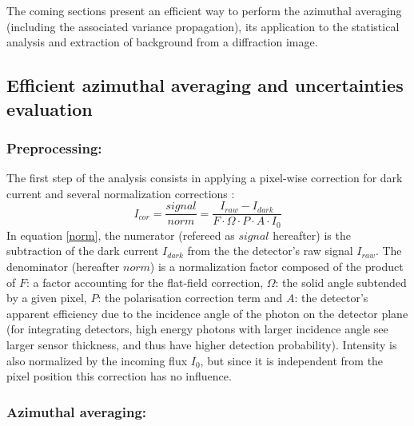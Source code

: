 \documentclass[a4paper,12pt,oneside]{article}              %
\begin{document}
The coming sections present an efficient way to perform the azimuthal averaging (including the associated variance propagation),  its application to the statistical analysis and extraction of background from a diffraction image. 

\subsection{Efficient azimuthal averaging and uncertainties evaluation}

\subsubsection{Preprocessing:}
The first step of the analysis consists in applying a pixel-wise correction for dark current and several normalization corrections \cite{pyfai_2020}:
\begin{equation}
\label{norm}
I_{cor} = \frac{signal}{norm}  = \frac{I_{raw} - I_{dark}}{F \cdot
\Omega \cdot P \cdot A \cdot I_0} 
\end{equation}
In  equation \ref{norm}, the numerator (refereed as $signal$ hereafter) is the subtraction of the dark current $I_{dark}$ from the the detector's raw signal $I_{raw}$.
The denominator (hereafter $norm$) is a normalization factor composed of the product of  $F$:  a factor accounting for the flat-field correction, $\Omega$: the solid angle subtended by a given pixel, $P$: the polarisation correction term and $A$: the detector's apparent efficiency due to the incidence angle of the photon on the detector plane (for integrating detectors, high energy photons with larger incidence angle see larger sensor thickness, and thus have higher detection probability).
Intensity is also normalized by the incoming flux $I_0$, but since it is independent from the pixel position this correction has no influence.

\subsubsection{Azimuthal averaging:} 
\end{document}
